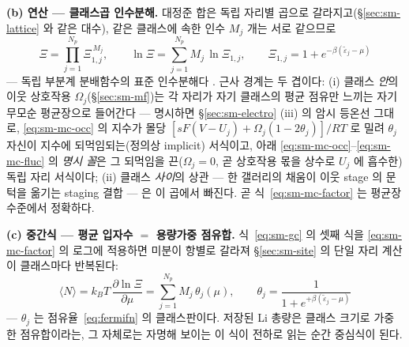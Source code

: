 \textbf{(b) 연산 --- 클래스곱 인수분해.} 대정준 합은 독립 자리별 곱으로 갈라지고(\S\ref{sec:sm-lattice} 와
같은 대수), 같은 클래스에 속한 인수 $M_j$ 개는 서로 같으므로
\begin{equation}
\Xi=\prod_{j=1}^{N_p}\Xi_{1,j}^{\,M_j},\qquad
\ln\Xi=\sum_{j=1}^{N_p}M_j\,\ln\Xi_{1,j},\qquad
\Xi_{1,j}=1+e^{-\beta(\tilde\varepsilon_j-\mu)}
\label{eq:sm-mc-factor}
\end{equation}
--- 독립 부분계 분배함수의 표준 인수분해다 \cite{hill1960,mcquarrie1976}. 근사 경계는 두 겹이다: (i) 클래스 \emph{안}의 이웃 상호작용 $\Omega_j$(\S\ref{sec:sm-mf})는 각 자리가
자기 클래스의 평균 점유만 느끼는 자기무모순 평균장으로 들어간다 --- 명시하면
\S\ref{sec:sm-electro} (iii) 의 암시 등온선 그대로, \eqref{eq:sm-mc-occ} 의 지수가 몰당
$[sF(V-U_j)+\Omega_j(1-2\theta_j)]/RT$ 로 밀려 $\theta_j$ 자신이 지수에 되먹임되는(정의상 implicit) 서식이고,
아래 \eqref{eq:sm-mc-occ}--\eqref{eq:sm-mc-fluc} 의 \emph{명시 꼴}은 그 되먹임을 끈($\Omega_j{=}0$, 곧
상호작용 몫을 상수로 $U_j$ 에 흡수한) 독립 자리 서식이다; (ii) 클래스
\emph{사이}의 상관 --- 한 갤러리의 채움이 이웃 stage 의 문턱을 옮기는 staging 결합 --- 은 이 곱에서 빠진다.
곧 식~\eqref{eq:sm-mc-factor} 는 평균장 수준에서 정확하다.

\textbf{(c) 중간식 --- 평균 입자수 $=$ 용량가중 점유합.} 식~\eqref{eq:sm-gc} 의 셋째 식을
\eqref{eq:sm-mc-factor} 의 로그에 적용하면 미분이 항별로 갈라져 \S\ref{sec:sm-site} 의 단일 자리 계산이
클래스마다 반복된다:
\begin{equation}
\langle N\rangle
=k_BT\,\frac{\partial\ln\Xi}{\partial\mu}
=\sum_{j=1}^{N_p}M_j\,\theta_j(\mu),
\qquad
\theta_j=\frac{1}{1+e^{+\beta(\tilde\varepsilon_j-\mu)}}
\label{eq:sm-mc-occ}
\end{equation}
--- $\theta_j$ 는 점유율~\eqref{eq:fermifn} 의 클래스판이다. 저장된 Li 총량은 클래스 크기로 가중한
점유합이라는, 그 자체로는 자명해 보이는 이 식이 전하로 읽는 순간 중심식이 된다.

